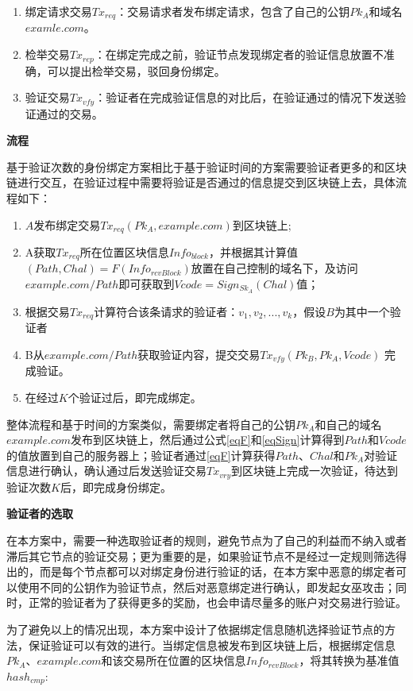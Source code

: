\begin{enumerate}
	\item 绑定请求交易$Tx_{req}$：交易请求者发布绑定请求，包含了自己的公钥$Pk_A$和域名$examle.com$。
	\item 检举交易$Tx_{rep}$：在绑定完成之前，验证节点发现绑定者的验证信息放置不准确，可以提出检举交易，驳回身份绑定。
	\item 验证交易$Tx_{vfy}$：验证者在完成验证信息的对比后，在验证通过的情况下发送验证通过的交易。
\end{enumerate}

\noindent\textbf{流程}

基于验证次数的身份绑定方案相比于基于验证时间的方案需要验证者更多的和区块链进行交互，在验证过程中需要将验证是否通过的信息提交到区块链上去，具体流程如下：

\begin{enumerate}
	\item $A$发布绑定交易$Tx_{req}(Pk_A, example.com)$到区块链上;
	\item  A获取$Tx_{req}$所在位置区块信息$Info_{block}$，并根据其计算值$(Path, Chal) = F(Info_{rcvBlock})$放置在自己控制的域名下，及访问$example.com/Path$即可获取到$Vcode = Sign_{Sk_A}(Chal)$值；
	\item 根据交易$Tx_{req}$计算符合该条请求的验证者：${v_1, v_2, ... , v_k}$，假设$B$为其中一个验证者
	\item B从$example.com/Path$获取验证内容，提交交易$Tx_{vfy}(Pk_B, Pk_A, Vcode)$ 完成验证。
	\item 在经过$K$个验证过后，即完成绑定。
\end{enumerate}

整体流程和基于时间的方案类似，需要绑定者将自己的公钥$Pk_A$和自己的域名$example.com$发布到区块链上，然后通过公式\eqref{eqF}和\eqref{eqSign}计算得到$Path$和$Vcode$的值放置到自己的服务器上；验证者通过\eqref{eqF}计算获得$Path$、$Chal$和$Pk_A$对验证信息进行确认，确认通过后发送验证交易$Tx_{vry}$到区块链上完成一次验证，待达到验证次数$K$后，即完成身份绑定。

\noindent\textbf{验证者的选取}

在本方案中，需要一种选取验证者的规则，避免节点为了自己的利益而不纳入或者滞后其它节点的验证交易；更为重要的是，如果验证节点不是经过一定规则筛选得出的，而是每个节点都可以对绑定身份进行验证的话，在本方案中恶意的绑定者可以使用不同的公钥作为验证节点，然后对恶意绑定进行确认，即发起女巫攻击；同时，正常的验证者为了获得更多的奖励，也会申请尽量多的账户对交易进行验证。

为了避免以上的情况出现，本方案中设计了依据绑定信息随机选择验证节点的方法，保证验证可以有效的进行。当绑定信息被发布到区块链上后，根据绑定信息$Pk_A$、$example.com$和该交易所在位置的区块信息$Info_{rcvBlock}$，将其转换为基准值$hash_{cmp}$:

